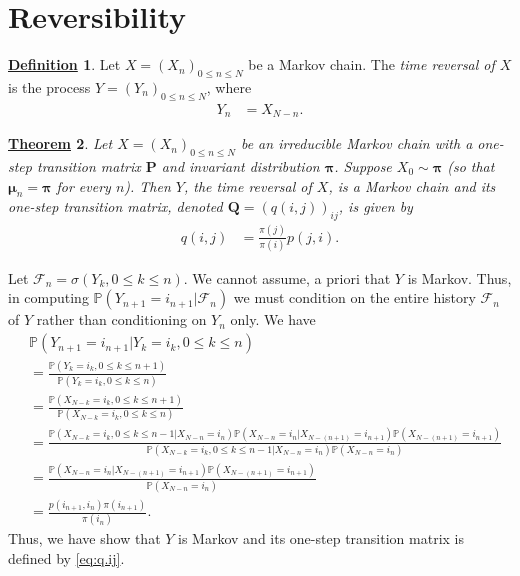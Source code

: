 \documentclass[12pt]{book}
\numberwithin{equation}{chapter}
\theoremstyle{plain}
\newtheorem{theorem}{\underline{Theorem}}
\numberwithin{theorem}{section}
\theoremstyle{definition}
\newtheorem{definition}[theorem]{\underline{Definition}}
\numberwithin{exercise}{chapter}
\let\oldendproof\endproof
\renewenvironment{proof}[1][\proofname]{%
  \oldproof[\scshape\underline{#1}]%
}{\oldendproof}
\newcommand{\<}{\langle}
\renewcommand{\>}{\rangle}
\renewcommand{\(}{\left(}
\renewcommand{\)}{\right)}
\renewcommand{\[}{\left[}
\renewcommand{\]}{\right]}
\newcommand\Pb{\mathds{P}}
\newcommand\Fc{\mathscr{F}}
\newcommand\sig{\sigma}
\newcommand\Pv{\pmb{P}}
\newcommand\Qv{\pmb{Q}}
\newcommand\muv{\pmb{\mu}}
\newcommand\piv{\pmb{\pi}}
\begin{document}

\section{Reversibility}
\label{sec:reversibility}

\begin{definition}
\label{def:Y.markov}
Let $X=(X_n)_{0 \leq n \leq N}$ be a Markov chain.  The \emph{time reversal of $X$} is the process $Y=(Y_n)_{0 \leq n \leq N}$, where
\begin{align}
Y_n
	&=	X_{N-n} .
\end{align}
\end{definition}

\begin{theorem}
\label{thm:Y.markov}
Let $X=(X_n)_{0 \leq n \leq N}$ be an irreducible Markov chain with a one-step transition matrix $\Pv$ and invariant distribution $\piv$.
Suppose $X_0 \sim \piv$ (so that $\muv_n = \piv$ for every $n$).
Then $Y$, the time reversal of $X$, is a Markov chain and its one-step transition matrix, denoted $\Qv = (q(i,j))_{ij}$, is given by
\begin{align}
q(i,j)
	&=	\frac{\pi(j)}{\pi(i)}p(j,i) . \label{eq:q.ij}
\end{align}
\end{theorem}

\begin{proof}
Let $\Fc_n = \sig( Y_k , 0 \leq k \leq n)$.
We cannot assume, a priori that $Y$ is Markov.  Thus, in computing $\Pb( Y_{n+1} = i_{n+1} | \Fc_n )$ we must condition on the entire history $\Fc_n$ of $Y$ rather than conditioning on $Y_n$ only.  We have
\begin{align}
&\Pb( Y_{n+1} = i_{n+1} | Y_k = i_k, 0 \leq k \leq n ) \\
	&=	\frac{ \Pb(  Y_k = i_k, 0 \leq k \leq n+1 ) }{ \Pb(  Y_k = i_k, 0 \leq k \leq n ) } \\
	&=	\frac{ \Pb(  X_{N-k} = i_k, 0 \leq k \leq n+1 ) }{ \Pb(  X_{N-k} = i_k, 0 \leq k \leq n ) } \\
	&=	\frac	{ \Pb(  X_{N-k} = i_k, 0 \leq k \leq n-1 | X_{N-n} = i_n) \Pb(X_{N-n} = i_n | X_{N-(n+1)} = i_{n+1}) \Pb(X_{N-(n+1)} = i_{n+1} )}
						{ \Pb(  X_{N-k} = i_k, 0 \leq k \leq n-1 | X_{N-n} = i_n) \Pb(X_{N-n} = i_n ) } \\
	&=	\frac	{ \Pb(X_{N-n} = i_n | X_{N-(n+1)} = i_{n+1}) \Pb(X_{N-(n+1)} = i_{n+1} )}
						{ \Pb(X_{N-n} = i_n ) } \\
	&=	\frac	{ p(i_{n+1},i_n) \pi(i_{n+1})}
						{ \pi(i_n) } .
\end{align}
Thus, we have show that $Y$ is Markov and its one-step transition matrix is defined by \eqref{eq:q.ij}.
\end{proof}
\end{document}
